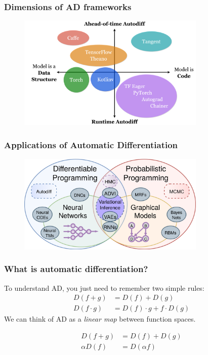 \documentclass{beamer}
\begin{document}
    \begin{frame}
        \frametitle{Dimensions of AD frameworks}
        \begin{figure}[H]
            \centering
            \includegraphics[width=0.8\textwidth]{ad_dsls.png}
        \end{figure}
    \end{frame}

    \begin{frame}
        \frametitle{Applications of Automatic Differentiation}
        \begin{figure}[H]
            \centering
            \includegraphics[width=0.8\textwidth]{diff_prob_prog.png}
        \end{figure}
    \end{frame}

    \begin{frame}
        \frametitle{What is automatic differentiation?}
        To understand AD, you just need to remember two simple rules:
        \begin{align*}
            D(f + g) &= D(f) + D(g) \\
            D(f \cdot g) &= D(f) \cdot g + f \cdot D(g)
        \end{align*}
        We can think of AD as a \textit{linear map} between function spaces.

        \begin{align*}
            D(f + g) &= D(f) + D(g) \\
            \alpha D(f) &= D(\alpha f)
        \end{align*}
    \end{frame}
\end{document}
